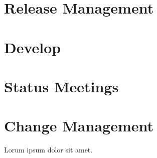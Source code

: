 \section{Release Management}

\section{Develop}
\section{Status Meetings}

\section{Change Management}

Lorum ipsum dolor sit amet.